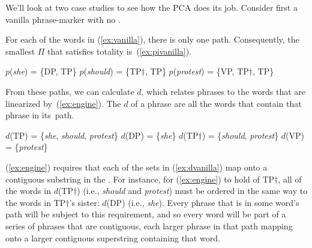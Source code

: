 \documentclass[output=paper]{langsci/langscibook}
\begin{document}
We'll look at two case studies to see how the \gls{PCA} does its job. Consider
first a vanilla phrase-marker with no .

\ea\label{ex:vanilla}
\z


For each of the words in (\ref{ex:vanilla}), there is only one path. Consequently, the smallest $\Pi$ that satisfies totality is~(\ref{ex:pivanilla}).
\begin{exe}
	\ex \label{ex:pivanilla}
	\begin{xlist}
		\ex $p$(\emph{she}) = \{DP, TP\}
		\ex $p$(\emph{should}) = \{TP$\dag$, TP\}
		\ex $p$(\emph{protest}) = \{VP, TP$\dag$, TP\}
	\end{xlist}
\end{exe}

From these paths, we can calculate $d$, which relates phrases to the words that are linearized by~(\ref{ex:engine}). The $d$ of a phrase are all the words that contain that phrase in its~path.
\begin{exe}
	\ex \label{ex:dvanilla}
	\begin{xlist}
		\ex $d$(TP) = \{\emph{she}, \emph{should}, \emph{protest}\}
		\ex $d$(DP) = \{\emph{she}\}
		\ex $d$(TP$\dag$) = \{\emph{should}, \emph{protest}\}
		\ex $d$(VP) = \{\emph{protest}\}
	\end{xlist}
\end{exe}

(\ref{ex:engine}) requires that each of the sets in (\ref{ex:dvanilla}) map onto a contiguous substring in the . For instance, for (\ref{ex:engine}) to hold of TP$\dag$, all of the words in $d$(TP$\dag$) (i.e., \emph{should} and \emph{protest}) must be ordered in the same way to the words in TP$\dag$'s sister: $d$(DP) (i.e., \emph{she}). Every phrase that is in some word's path will be subject to this requirement, and so every word will be part of a series of phrases that are contiguous, each larger phrase in that path mapping onto a larger contiguous superstring containing that word.
\end{document}
